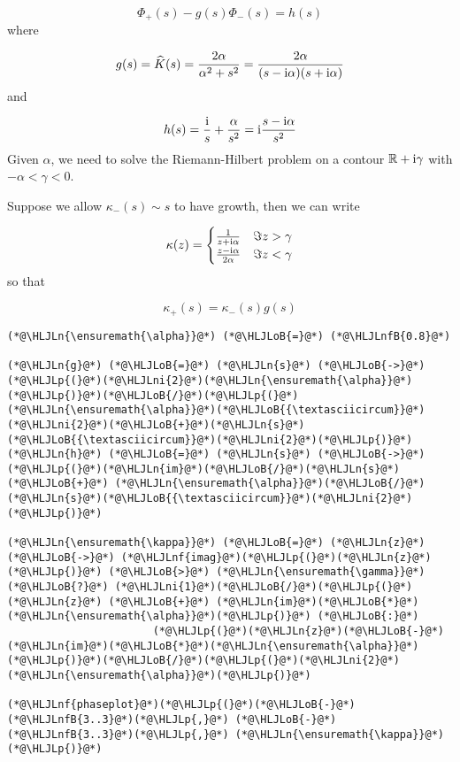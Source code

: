 \documentclass[12pt,a4paper]{article}
\newcommand{\HLJLn}[1]{#1}
\newcommand{\HLJLnf}[1]{\textcolor[RGB]{66,102,213}{#1}}
\newcommand{\HLJLnfB}[1]{\textcolor[RGB]{59,151,46}{#1}}
\newcommand{\HLJLni}[1]{\textcolor[RGB]{59,151,46}{#1}}
\newcommand{\HLJLoB}[1]{\textcolor[RGB]{102,102,102}{\textbf{#1}}}
\newcommand{\HLJLp}[1]{#1}
\def\I{ {\rm i} }
\begin{document}
\[
\Phi_+(s) - g(s) \Phi_-(s) = h(s)
\]
where

\[
g(s) = \widehat K(s) = {2\alpha \over \alpha^2 +s^2}= {2 \alpha \over (s-\I \alpha)(s+\I \alpha)}
\]
and

\[
h(s) = {\I \over s} + {\alpha \over s^2} = \I {s -\I \alpha \over s^2}
\]
Given $\alpha$, we need to solve the Riemann-Hilbert problem on a contour $\mathbb{R} + \I\gamma$ with $-\alpha < \gamma < 0$.

Suppose we allow $\kappa_-(s) \sim s$ to have growth, then we can write

\[
\kappa(z) = \begin{cases} {1 \over z+\I \alpha }& \Im z > \gamma \\
                        {z-\I \alpha \over 2 \alpha} & \Im z < \gamma
\end{cases}
\]
so that

\[
\kappa_+(s) = \kappa_-(s) g(s)
\]

\begin{lstlisting}
(*@\HLJLn{\ensuremath{\alpha}}@*) (*@\HLJLoB{=}@*) (*@\HLJLnfB{0.8}@*)

(*@\HLJLn{g}@*) (*@\HLJLoB{=}@*) (*@\HLJLn{s}@*) (*@\HLJLoB{->}@*) (*@\HLJLp{(}@*)(*@\HLJLni{2}@*)(*@\HLJLn{\ensuremath{\alpha}}@*)(*@\HLJLp{)}@*)(*@\HLJLoB{/}@*)(*@\HLJLp{(}@*)(*@\HLJLn{\ensuremath{\alpha}}@*)(*@\HLJLoB{{\textasciicircum}}@*)(*@\HLJLni{2}@*)(*@\HLJLoB{+}@*)(*@\HLJLn{s}@*)(*@\HLJLoB{{\textasciicircum}}@*)(*@\HLJLni{2}@*)(*@\HLJLp{)}@*)
(*@\HLJLn{h}@*) (*@\HLJLoB{=}@*) (*@\HLJLn{s}@*) (*@\HLJLoB{->}@*) (*@\HLJLp{(}@*)(*@\HLJLn{im}@*)(*@\HLJLoB{/}@*)(*@\HLJLn{s}@*) (*@\HLJLoB{+}@*) (*@\HLJLn{\ensuremath{\alpha}}@*)(*@\HLJLoB{/}@*)(*@\HLJLn{s}@*)(*@\HLJLoB{{\textasciicircum}}@*)(*@\HLJLni{2}@*)(*@\HLJLp{)}@*)

(*@\HLJLn{\ensuremath{\kappa}}@*) (*@\HLJLoB{=}@*) (*@\HLJLn{z}@*) (*@\HLJLoB{->}@*) (*@\HLJLnf{imag}@*)(*@\HLJLp{(}@*)(*@\HLJLn{z}@*)(*@\HLJLp{)}@*) (*@\HLJLoB{>}@*) (*@\HLJLn{\ensuremath{\gamma}}@*) (*@\HLJLoB{?}@*) (*@\HLJLni{1}@*)(*@\HLJLoB{/}@*)(*@\HLJLp{(}@*)(*@\HLJLn{z}@*) (*@\HLJLoB{+}@*) (*@\HLJLn{im}@*)(*@\HLJLoB{*}@*)(*@\HLJLn{\ensuremath{\alpha}}@*)(*@\HLJLp{)}@*) (*@\HLJLoB{:}@*)
                       (*@\HLJLp{(}@*)(*@\HLJLn{z}@*)(*@\HLJLoB{-}@*)(*@\HLJLn{im}@*)(*@\HLJLoB{*}@*)(*@\HLJLn{\ensuremath{\alpha}}@*)(*@\HLJLp{)}@*)(*@\HLJLoB{/}@*)(*@\HLJLp{(}@*)(*@\HLJLni{2}@*)(*@\HLJLn{\ensuremath{\alpha}}@*)(*@\HLJLp{)}@*)

(*@\HLJLnf{phaseplot}@*)(*@\HLJLp{(}@*)(*@\HLJLoB{-}@*)(*@\HLJLnfB{3..3}@*)(*@\HLJLp{,}@*) (*@\HLJLoB{-}@*)(*@\HLJLnfB{3..3}@*)(*@\HLJLp{,}@*) (*@\HLJLn{\ensuremath{\kappa}}@*)(*@\HLJLp{)}@*)
\end{lstlisting}
\end{document}
